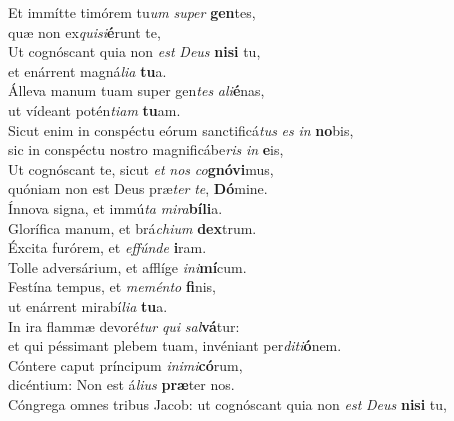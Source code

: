 \evenverse Et immítte timórem tu\textit{um} \textit{su}\textit{per} \textbf{gen}tes,~\*\\
\evenverse quæ non ex\textit{qui}\textit{si}\textbf{é}runt te,\\
\oddverse Ut cognóscant quia non \textit{est} \textit{De}\textit{us} \textbf{ni}\textbf{si} tu,~\*\\
\oddverse et enárrent magná\textit{li}\textit{a} \textbf{tu}a.\\
\evenverse Álleva manum tuam super gen\textit{tes} \textit{a}\textit{li}\textbf{é}nas,~\*\\
\evenverse ut vídeant potén\textit{ti}\textit{am} \textbf{tu}am.\\
\oddverse Sicut enim in conspéctu eórum sanctificá\textit{tus} \textit{es} \textit{in} \textbf{no}bis,~\*\\
\oddverse sic in conspéctu nostro magnificábe\textit{ris} \textit{in} \textbf{e}is,\\
\evenverse Ut cognóscant te, sicut \textit{et} \textit{nos} \textit{co}\textbf{gnó}\textbf{vi}mus,~\*\\
\evenverse quóniam non est Deus præ\textit{ter} \textit{te}, \textbf{Dó}mine.\\
\oddverse Ínnova signa, et immú\textit{ta} \textit{mi}\textit{ra}\textbf{bí}\textbf{li}a.~\*\\
\oddverse Glorífica manum, et brá\textit{chi}\textit{um} \textbf{dex}trum.\\
\evenverse Éxcita furórem, et \textit{ef}\textit{fún}\textit{de} \textbf{i}ram.~\*\\
\evenverse Tolle adversárium, et afflíge \textit{i}\textit{ni}\textbf{mí}cum.\\
\oddverse Festína tempus, et \textit{me}\textit{mén}\textit{to} \textbf{fi}nis,~\*\\
\oddverse ut enárrent mirabí\textit{li}\textit{a} \textbf{tu}a.\\
\evenverse In ira flammæ devoré\textit{tur} \textit{qui} \textit{sal}\textbf{vá}tur:~\*\\
\evenverse et qui péssimant plebem tuam, invéniant per\textit{di}\textit{ti}\textbf{ó}nem.\\
\oddverse Cóntere caput príncipum \textit{i}\textit{ni}\textit{mi}\textbf{có}rum,~\*\\
\oddverse dicéntium: Non est á\textit{li}\textit{us} \textbf{præ}ter nos.\\
\evenverse Cóngrega omnes tribus Jacob: ut cognóscant quia non \textit{est} \textit{De}\textit{us} \textbf{ni}\textbf{si} tu,~\*\\
